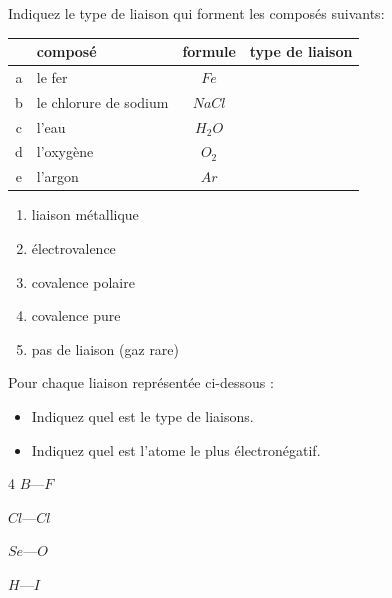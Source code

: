 \documentclass[
  11pt,
  a4paper,
  openany]{book}
\providecommand{\tightlist}{%
  \setlength{\itemsep}{0pt}\setlength{\parskip}{0pt}}
\begin{document}
\begin{Exercise}
Indiquez le type de liaison qui forment les composés suivants:

\end{Exercise}

\begin{longtable}[]{@{}clcc@{}}
\toprule\noalign{}
& composé & formule & type de liaison \\
\midrule\noalign{}
\endhead
\bottomrule\noalign{}
\endlastfoot
a & le fer & \(Fe\) & \\
b & le chlorure de sodium & \(NaCl\) & \\
c & l'eau & \(H_2O\) & \\
d & l'oxygène & \(O_2\) & \\
e & l'argon & \(Ar\) & \\
\end{longtable}

\begin{Answer}

\begin{enumerate}
\def\labelenumi{\alph{enumi}.}
\tightlist
\item
  liaison métallique
\item
  électrovalence
\item
  covalence polaire
\item
  covalence pure
\item
  pas de liaison (gaz rare)
\end{enumerate}

\end{Answer}

\newpage

\begin{Exercise}

Pour chaque liaison représentée ci-dessous :

\begin{itemize}
\tightlist
\item
  Indiquez quel est le type de liaisons.
\item
  Indiquez quel est l'atome le plus électronégatif.
\end{itemize}

\begin{multicols}{4}
\(B—F\)

\(Cl—Cl\)

\(Se—O\)

\(H—I\)

\end{multicols}


\end{Exercise}
\end{document}
